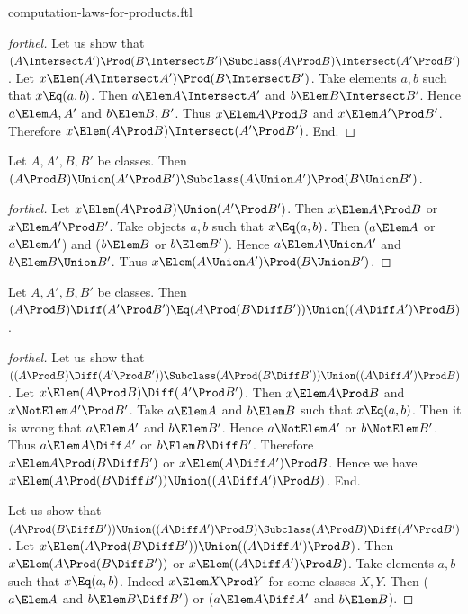 \documentclass{stex}
\begin{document}
\begin{smodule}{computation-laws-for-products.ftl}
\begin{proof}[forthel]
  Let us show that $(A \Intersect A') \Prod (B \Intersect B') \Subclass (A \Prod B) \Intersect (A' \Prod B')$.
    Let $x \Elem (A \Intersect A') \Prod (B \Intersect B')$.
    Take elements $a, b$ such that $x \Eq (a, b)$.
    Then $a \Elem A \Intersect A'$ and $b \Elem B \Intersect B'$.
    Hence $a \Elem A, A'$ and $b \Elem B, B'$.
    Thus $x \Elem A \Prod B$ and $x \Elem A' \Prod B'$.
    Therefore $x \Elem (A \Prod B) \Intersect (A' \Prod B')$.
  End.
\end{proof}

\begin{proposition*}[forthel]
  Let $A, A', B, B'$ be classes.
  Then $(A \Prod B) \Union (A' \Prod B') \Subclass (A \Union A') \Prod (B \Union B')$.
\end{proposition*}
\begin{proof}[forthel]
  Let $x \Elem (A \Prod B) \Union (A' \Prod B')$.
  Then $x \Elem A \Prod B$ or $x \Elem A' \Prod B'$.
  Take objects $a, b$ such that $x \Eq (a, b)$.
  Then ($a \Elem A$ or $a \Elem A'$) and ($b \Elem B$ or $b \Elem B'$).
  Hence $a \Elem A \Union A'$ and $b \Elem B \Union B'$.
  Thus $x \Elem (A \Union A') \Prod (B \Union B')$.
\end{proof}

\begin{proposition*}[forthel]
  Let $A, A', B, B'$ be classes.
  Then $(A \Prod B) \Diff (A' \Prod B') \Eq (A \Prod (B \Diff B')) \Union ((A \Diff A') \Prod B)$.
\end{proposition*}
\begin{proof}[forthel]
  Let us show that $((A \Prod B) \Diff (A' \Prod B')) \Subclass (A \Prod (B \Diff B')) \Union ((A \Diff A') \Prod B)$.
    Let $x \Elem (A \Prod B) \Diff (A' \Prod B')$.
    Then $x \Elem A \Prod B$ and $x \NotElem A' \Prod B'$.
    Take $a \Elem A$ and $b \Elem B$ such that $x \Eq (a, b)$.
    Then it is wrong that $a \Elem A'$ and $b \Elem B'$.
    Hence $a \NotElem A'$ or $b \NotElem B'$.
    Thus $a \Elem A \Diff A'$ or $b \Elem B \Diff B'$.
    Therefore $x \Elem A \Prod (B \Diff B')$ or $x \Elem (A \Diff A') \Prod B$.
    Hence we have $x \Elem (A \Prod (B \Diff B')) \Union ((A \Diff A') \Prod B)$.
  End.

  Let us show that $(A \Prod (B \Diff B')) \Union ((A \Diff A') \Prod B) \Subclass (A \Prod B) \Diff (A' \Prod B')$.
    Let $x \Elem (A \Prod (B \Diff B')) \Union ((A \Diff A') \Prod B)$.
    Then $x \Elem (A \Prod (B \Diff B'))$ or $x \Elem ((A \Diff A') \Prod B)$.
    Take elements $a,b$ such that $x \Eq (a, b)$.
    Indeed $x \Elem X \Prod Y$ for some classes $X,Y$.
    Then ($a \Elem A$ and $b \Elem B \Diff B'$) or ($a \Elem A \Diff A'$ and $b \Elem B$).


\end{proof}
\end{smodule}
\end{document}
